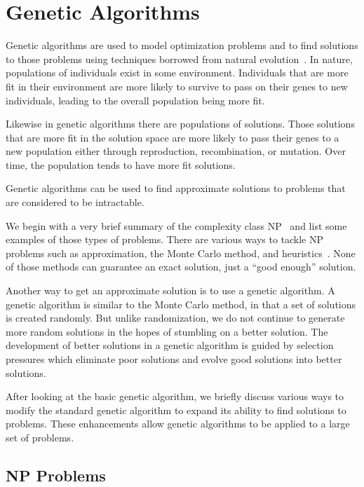 \clearpage
\chapter{Genetic Algorithms}\label{chap:geneticAlgorithms}

Genetic algorithms are used to model optimization problems and to find solutions
to those problems using techniques borrowed from natural
evolution~\cite{Holland1992,goldberg1989genetic,fogel2000evolutionary}. In
nature, populations of individuals exist in some environment. Individuals that
are more fit in their environment are more likely to survive to pass on their
genes to new individuals, leading to the overall population being more fit.

Likewise in genetic algorithms there are populations of solutions. Those
solutions that are more fit in the solution space are more likely to pass their
genes to a new population either through reproduction, recombination, or
mutation. Over time, the population tends to have more fit solutions.

Genetic algorithms can be used to find approximate solutions to problems that
are considered to be intractable.

We begin with a very brief summary of the complexity class
NP~\cite{alsuwaiyel1999algorithms,Cormen:2009:IAT:1614191} and list some
examples of those types of problems. There are various ways to tackle NP
problems such as approximation, the Monte Carlo method, and
heuristics~\cite{russell2010artificial}. None of those methods can guarantee an
exact solution, just a ``good enough'' solution.

Another way to get an approximate solution is to use a genetic algorithm. A
genetic algorithm is similar to the Monte Carlo method, in that a set of
solutions is created randomly. But unlike randomization, we do not continue to
generate more random solutions in the hopes of stumbling on a better solution.
The development of better solutions in a genetic algorithm is guided by
selection pressures which eliminate poor solutions and evolve good solutions
into better solutions.

After looking at the basic genetic algorithm, we briefly discuss various ways to
modify the standard genetic algorithm to expand its ability to find solutions to
problems. These enhancements allow genetic algorithms to be applied to a large
set of problems.

\section{NP Problems}

